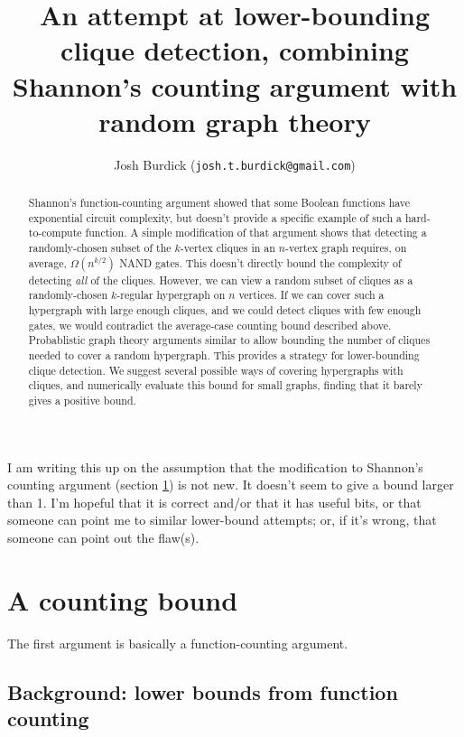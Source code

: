 \documentclass[12pt]{article}
\theoremstyle{definition}
\begin{document}
\title{An attempt at lower-bounding clique detection, combining
Shannon's counting argument with random graph theory}

\author{Josh Burdick ({\tt josh.t.burdick@gmail.com})}
\maketitle
\begin{abstract}
Shannon's function-counting argument
\cite{shannon_synthesis_1949} showed that some Boolean functions have
exponential circuit complexity, but doesn't provide a specific example
of such a hard-to-compute function. A simple modification of that argument
shows that detecting a randomly-chosen subset of the $k$-vertex cliques in an
$n$-vertex graph requires, on average, $\Omega(n^{k/2})$ NAND gates.
This doesn't directly bound the complexity of detecting {\em all} of the cliques.
However, we can view a random subset of cliques as a randomly-chosen
$k$-regular hypergraph on $n$ vertices.
If we can cover such a hypergraph with large enough cliques,
and we could detect cliques with few enough gates, we would contradict
the average-case counting bound described above.
Probablistic graph theory arguments
\cite{bollobas1976cliques} similar to \cite{bollobas1993clique}
allow bounding the number of cliques needed to
cover a random hypergraph.
This provides a strategy for lower-bounding clique detection.
We suggest several possible ways of covering hypergraphs with cliques,
and numerically evaluate this bound for small graphs, finding that
it barely gives a positive bound.
\end{abstract}

I am writing this up on the assumption that the modification
to Shannon's counting argument (section \ref{countingBound})
is not new. It doesn't seem to give a bound larger than 1.
I'm hopeful that it is correct and/or that it has useful bits,
or that someone can point me
to similar lower-bound attempts; or, if it's wrong, that 
someone can point out the flaw(s).

\newpage

\tableofcontents

\section{A counting bound}
\label{countingBound}

The first argument is basically a function-counting argument.

\subsection{Background: lower bounds from function counting}
\end{document}
